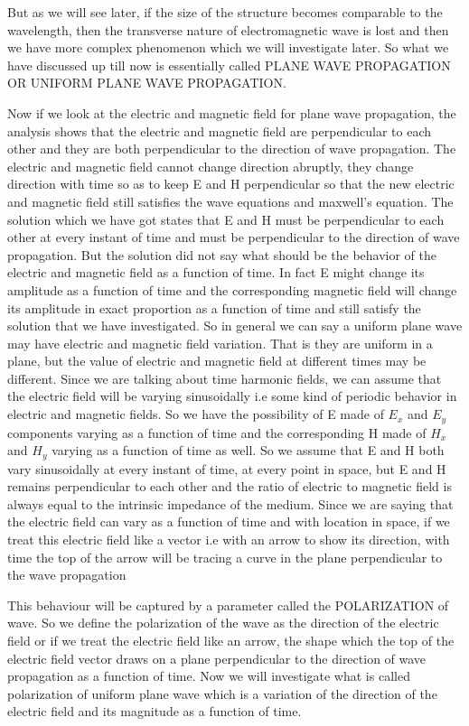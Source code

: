But as we will see later, if the size of the structure becomes comparable to the wavelength, then the transverse nature of electromagnetic wave is lost and then we have more complex phenomenon which we will investigate later. So what we have discussed up till now is essentially called PLANE WAVE PROPAGATION OR UNIFORM PLANE WAVE PROPAGATION.

Now if we look  at the electric and magnetic field for plane wave propagation, the analysis shows that the electric and magnetic field are perpendicular to each other and they are both perpendicular  to the direction of wave propagation. The electric and magnetic field cannot change direction abruptly, they change direction  with time so as to keep E and H perpendicular so that the new electric and magnetic field still satisfies the wave equations and maxwell's equation. The solution which we have got states that E and H must be perpendicular to each other at every instant of time and must be perpendicular to the direction of wave propagation. But the solution did not say what should be the behavior of the electric and magnetic field as a function of time. In fact E might change its amplitude as a function of time and the corresponding magnetic field will change its amplitude in exact proportion as a function of time and still satisfy the solution that we have investigated. So in general we can say a uniform plane wave may have electric and magnetic field variation. That is they are uniform in a plane, but the value of electric and magnetic field at different times may be different. Since we are talking about time harmonic fields, we can assume that the electric field will be varying sinusoidally i.e some kind of periodic behavior in electric and magnetic fields. So we have the possibility of E made of $E_x$ and $E_y$ components varying as a function of time and the corresponding H made of $H_x$ and $H_y$ varying as a function of time as well. So we assume that E and H both vary sinusoidally at every instant of time, at every point in space, but E and H remains perpendicular to each other and the ratio of electric to magnetic field is always equal to the intrinsic impedance of the medium. 
Since we are saying that the electric field can vary as a function of time and with location in space, if we treat this electric field like a vector i.e with an arrow to show its direction, with time the top of the arrow will be tracing a curve in the plane perpendicular to the wave propagation

This behaviour will be captured by a parameter called the POLARIZATION of  wave. So we define the polarization of the wave as the direction of the electric field or if we treat the electric field like an arrow, the shape which the top of the electric field vector draws on a plane perpendicular to the direction of wave propagation as a function of time. Now we will investigate what is called polarization of uniform plane wave which is a variation of the direction of the electric field and its magnitude as a function of time.

